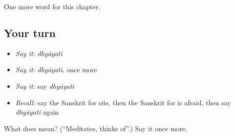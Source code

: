 \begin{grammarlens}[title={What you've built}]
One more word for this chapter.
\end{grammarlens}

\subsection*{Your turn}
\begin{itemize}
\raggedright
  \item \emph{Say it:} \emph{dhyāyati}
  \item \emph{Say it:} \emph{dhyāyati}, once more
  \item \emph{Say it:} say \emph{dhyāyati}
  \item \emph{Recall:} say the Sanskrit for sits, then the Sanskrit for is afraid, then say \emph{dhyāyati} again
\end{itemize}

\begin{tcolorbox}[breakable,colback=teal!4,colframe=teal!35!black,title={Before you move on}]
What does  mean? (\textquotedblleft{}Meditates, thinks of\textquotedblright{}.) Say it once more.
\end{tcolorbox}
